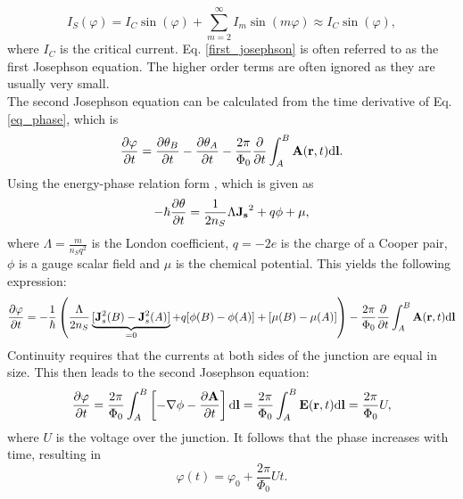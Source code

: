 \documentclass[a4paper,10pt]{article}
\newcommand{\dif}{\mathrm{d}}
\begin{document}
\begin{equation}
    I_S(\varphi) = I_C \sin(\varphi) + \sum^{\infty}_{m = 2} I_m \sin(m \varphi) \approx I_C \sin(\varphi),
    \label{first_josephson}
\end{equation}
where $I_C$ is the critical current. Eq. \ref{first_josephson} is often referred to as the first Josephson equation. The higher order terms are often ignored as they are usually very small. \\
The second Josephson equation can be calculated from the time derivative of Eq. \ref{eq_phase}, which is 
\begin{equation}
    \pdv{\varphi}{t} = \pdv{\theta_B}{t} - \pdv{\theta_A}{t} - \frac{2 \pi}{\Phi_0} \pdv{}{t} \int^B_A \mathbf{A}(\mathbf{r},t) \dif \mathbf{l}.
\end{equation}
Using the energy-phase relation form \cite{grossmarx}, which is given as 
\begin{equation}
    -\hbar \pdv{\theta}{t} = \frac{1}{2 n_S} \Lambda \mathbf{J_s}^2 + q \phi + \mu,
\end{equation}
where $\Lambda = \frac{m}{n_S q^2}$ is the London coefficient, $q = -2 e$ is the charge of a Cooper pair, $\phi$ is a gauge scalar field and $\mu$ is the chemical potential. This yields the following expression:
\begin{equation}
    \pdv{\varphi}{t} = - \frac{1}{\hbar} \left( \frac{\Lambda}{2 n_S} \underbrace{[\mathbf{J}_s^2(B) - \mathbf{J}_s^2(A)]}_{ = 0} + q[\phi(B) - \phi(A)] + [\mu(B) - \mu(A)] \right) -  \frac{2 \pi}{\Phi_0} \pdv{}{t} \int^B_A \mathbf{A}(\mathbf{r},t) \dif \mathbf{l}
\end{equation}
Continuity requires that the currents at both sides of the junction are equal in size. This then leads to the second Josephson equation:
\begin{equation}
\pdv{\varphi}{t} = \frac{2 \pi}{\Phi_0} \int^B_A \left[ - \nabla \phi - \pdv{\mathbf{A}}{t} \right] \dif \mathbf{l} = \frac{2 \pi}{\Phi_0} \int^B_A \mathbf{E}(\mathbf{r},t) \dif \mathbf{l} = \frac{2 \pi}{\Phi_0} U,
\end{equation}
where $U$ is the voltage over the junction. It follows that the phase increases with time, resulting in 
\begin{equation}
    \varphi(t) = \varphi_0 + \frac{2 \pi}{\Phi_0} U t.
    \label{eq_josephson_2}
\end{equation}
\end{document}

